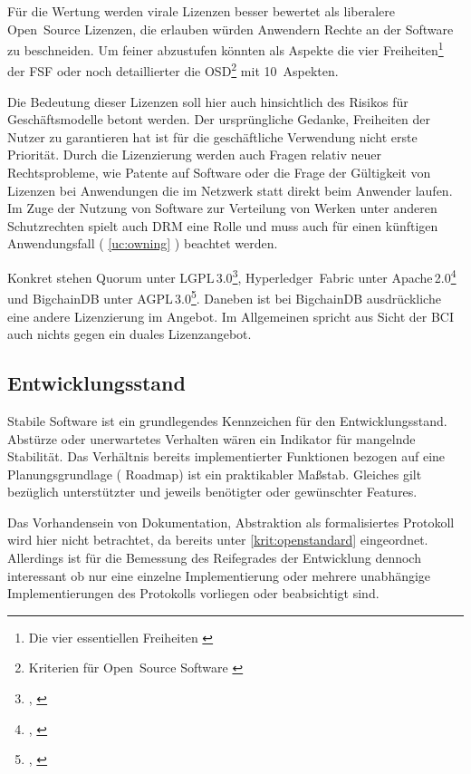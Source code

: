 Für die Wertung werden virale Lizenzen besser bewertet als liberalere Open~Source Lizenzen, die erlauben würden Anwendern Rechte an der Software zu beschneiden.
Um feiner abzustufen könnten als Aspekte die vier Freiheiten\footnote{Die vier essentiellen Freiheiten \autocite{w:fsf-freedoms}} der \gls{FSF}
oder noch detaillierter die \gls{OSD}\footnote{Kriterien für Open~Source Software \autocite{w:iso-osd}} mit 10~Aspekten.

Die Bedeutung dieser Lizenzen soll hier auch hinsichtlich des Risikos für Geschäftsmodelle betont werden.
Der ursprüngliche Gedanke, Freiheiten der Nutzer zu garantieren hat ist für die geschäftliche Verwendung nicht erste Priorität.
Durch die Lizenzierung werden auch Fragen relativ neuer Rechtsprobleme, wie Patente auf Software oder die Frage der Gültigkeit von Lizenzen bei Anwendungen die im Netzwerk statt direkt beim Anwender laufen.
Im Zuge der Nutzung von Software zur Verteilung von Werken unter anderen Schutzrechten spielt auch \gls{DRM} eine Rolle und muss auch für einen künftigen Anwendungsfall (\zB{} \ref{uc:owning} ) beachtet werden.

Konkret stehen Quorum unter LGPL\,3.0\footnote{\cite{w:license:lgpl3}, \cite{w:quorum-jpmorgan:github}}, Hyperledger~Fabric unter Apache\,2.0\footnote{\cite{w:license:al2}, \cite{w:hyperledger-fabric:github}} und BigchainDB unter AGPL\,3.0\footnote{\cite{w:license:agpl3}, \cite{w:bigchaindb:github}}. Daneben ist bei BigchainDB ausdrückliche eine andere Lizenzierung im Angebot. Im Allgemeinen spricht aus Sicht der \gls{BCI} auch nichts gegen ein duales Lizenzangebot.

\subsection{Entwicklungsstand}\label{krit:entwicklungsstand}

Stabile Software ist ein grundlegendes Kennzeichen für den Entwicklungsstand.
Abstürze oder unerwartetes Verhalten wären ein Indikator für mangelnde Stabilität.
Das Verhältnis bereits implementierter Funktionen bezogen auf eine Planungsgrundlage (\zB{} Roadmap) ist ein praktikabler Maßstab.
Gleiches gilt bezüglich unterstützter und jeweils benötigter oder gewünschter Features.

Das Vorhandensein von Dokumentation, Abstraktion als formalisiertes Protokoll wird hier nicht betrachtet, da bereits unter
\ref{krit:openstandard} eingeordnet.
Allerdings ist für die Bemessung des Reifegrades der Entwicklung dennoch interessant ob nur eine einzelne Implementierung oder mehrere unabhängige Implementierungen des Protokolls vorliegen oder beabsichtigt sind.


